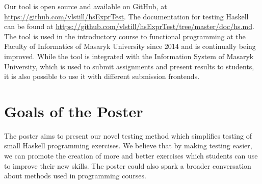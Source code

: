 \documentclass[sigconf]{acmart} %
\begin{document}
Our tool is open source and available on GitHub, at
\url{https://github.com/vlstill/hsExprTest}.
The documentation for testing Haskell can be found at
\url{https://github.com/vlstill/hsExprTest/tree/master/doc/hs.md}.
The tool is used in the introductory course to functional programming at the
Faculty of Informatics of Masaryk University since 2014 and is continually
being improved.
While the tool is integrated with the Information System of Masaryk University,
which is used to submit assignments and present results to students, it is also
possible to use it with different submission frontends.

\section{Goals of the Poster}

The poster aims to present our novel testing method which simplifies testing of
small Haskell programming exercises.
We believe that by making testing easier, we can promote the creation of more
and better exercises which students can use to improve their new skills.
The poster could also spark a broader conversation about methods used in
programming courses.

\balance


\end{document}
